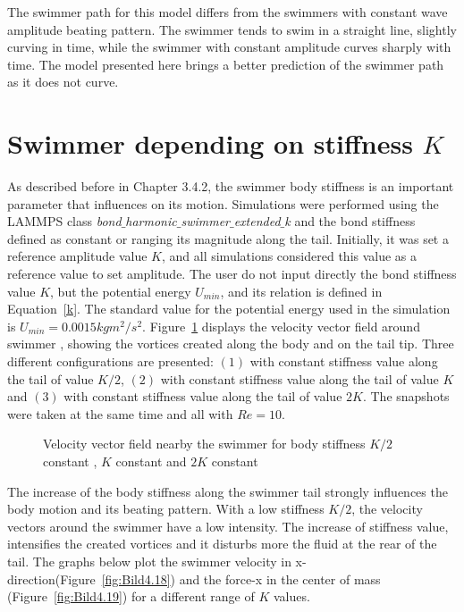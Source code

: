 The swimmer path for this model differs from the swimmers with constant wave amplitude beating pattern. The swimmer tends to swim in a straight line, slightly curving in time, while
the swimmer with constant amplitude curves sharply with time. The model presented here brings a better prediction of the swimmer path as it does not curve.


\section{Swimmer depending on stiffness $K$}
\label{sec:section 5}

As described before in Chapter 3.4.2, the swimmer body stiffness is an important parameter that influences on its motion. Simulations were performed using the LAMMPS class
\textit{bond$\_$harmonic$\_$swimmer$\_$extended$\_$k} and the bond stiffness defined as constant or ranging its magnitude along the tail. Initially, it was set a reference
amplitude value $K$, and all simulations considered this value  as a reference value to set amplitude. The user do not input directly the bond stiffness value $K$, but the potential
energy $U_{min}$, and its relation is defined in Equation~\ref{k}. The standard value for the potential energy used in the simulation is $U_{min}= 0.0015 kgm^2/s^2$. Figure~\ref{fig:Bild4.17} 
displays the velocity vector field around  swimmer , showing the vortices created along the body and on the tail tip. Three different configurations are presented: $(1)$
with constant stiffness value along the tail of value $K/2$, $(2)$ with constant stiffness value along the tail of value $K$ and $(3)$ with constant stiffness value along the tail of value $2K$.
The snapshots were taken at the same time and all with $Re = 10$.


\begin{figure}[H]
\centering
  \begin{footnotesize}
  
  \caption[]{Velocity vector field nearby the swimmer for body stiffness $K/2$ constant , $K$ constant and $2K$ constant}
   \label{fig:Bild4.17}
  \end{footnotesize}
\end{figure}

The increase of the body stiffness along the swimmer tail strongly influences the body motion and its beating pattern. With a low stiffness $K/2$, the velocity vectors around the swimmer
have a low intensity. The increase of stiffness value, intensifies the created vortices and it disturbs more the fluid at the rear of the tail.
The graphs below plot the swimmer velocity in x-direction(Figure~\ref{fig:Bild4.18}) and the force-x in the center of mass (Figure~\ref{fig:Bild4.19}) for a different range of $K$ values.

